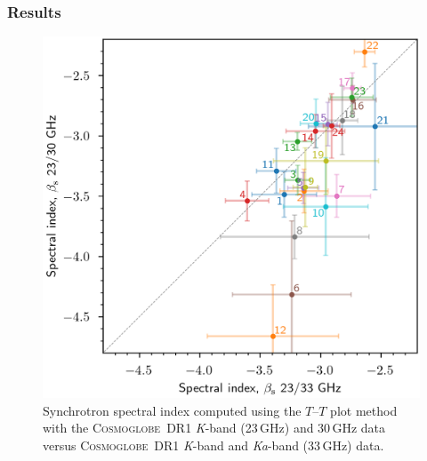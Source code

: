\documentclass[twocolumn]{../../common/aa}
\newcommand{\Cosmoglobe}{\textsc{Cosmoglobe}}
\newcommand{\K}[0]{\textit K}
\newcommand{\Ka}[0]{\textit{Ka}}
\begin{document}
\subsubsection{Results}
\label{sec:tt_plot_results}

\begin{figure}
        \centering
        \includegraphics[width=\linewidth]{figures/xy_regions.png}
        \caption{
		Synchrotron spectral index computed using the $T$--$T$ plot method with the \Cosmoglobe\ DR1 \K-band (23\,GHz) and 30\,GHz data versus \Cosmoglobe\ DR1 \K-band and \Ka-band (33\,GHz) data.}
        \label{fig:cos30_xyplot}
\end{figure}
\end{document}
